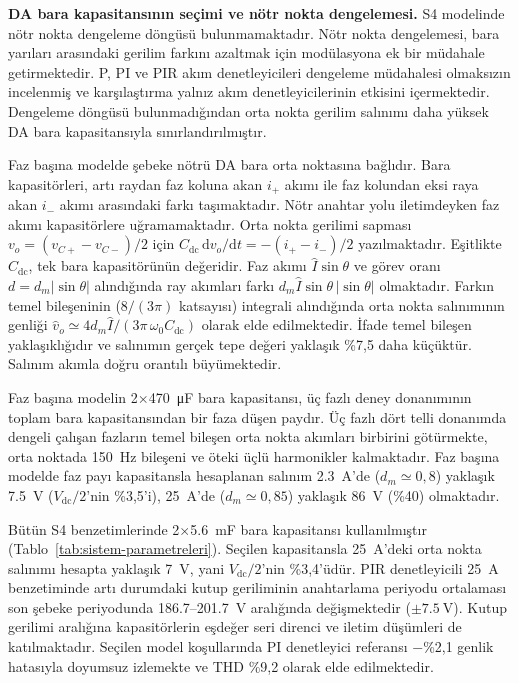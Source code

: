 \textbf{DA bara kapasitansının seçimi ve nötr nokta dengelemesi.} S4 modelinde nötr nokta dengeleme döngüsü bulunmamaktadır. Nötr nokta dengelemesi, bara yarıları arasındaki gerilim farkını azaltmak için modülasyona ek bir müdahale getirmektedir. P, PI ve PIR akım denetleyicileri dengeleme müdahalesi olmaksızın incelenmiş ve karşılaştırma yalnız akım denetleyicilerinin etkisini içermektedir. Dengeleme döngüsü bulunmadığından orta nokta gerilim salınımı daha yüksek DA bara kapasitansıyla sınırlandırılmıştır.

Faz başına modelde şebeke nötrü DA bara orta noktasına bağlıdır. Bara kapasitörleri, artı raydan faz koluna akan $i_{+}$ akımı ile faz kolundan eksi raya akan $i_{-}$ akımı arasındaki farkı taşımaktadır. Nötr anahtar yolu iletimdeyken faz akımı kapasitörlere uğramamaktadır. Orta nokta gerilimi sapması $v_o=(v_{C+}-v_{C-})/2$ için $C_{\mathrm{dc}}\,\mathrm{d}v_o/\mathrm{d}t=-(i_{+}-i_{-})/2$ yazılmaktadır. Eşitlikte $C_{\mathrm{dc}}$, tek bara kapasitörünün değeridir. Faz akımı $\hat I\sin\theta$ ve görev oranı $d=d_m|\sin\theta|$ alındığında ray akımları farkı $d_m\hat I\sin\theta\,|\sin\theta|$ olmaktadır. Farkın temel bileşeninin ($8/(3\pi)$ katsayısı) integrali alındığında orta nokta salınımının genliği $\hat v_o\simeq4d_m\hat I/(3\pi\,\omega_0C_{\mathrm{dc}})$ olarak elde edilmektedir. İfade temel bileşen yaklaşıklığıdır ve salınımın gerçek tepe değeri yaklaşık \%7,5 daha küçüktür. Salınım akımla doğru orantılı büyümektedir.

Faz başına modelin 2$\times$\SI{470}{\micro\farad} bara kapasitansı, üç fazlı deney donanımının toplam bara kapasitansından bir faza düşen paydır. Üç fazlı dört telli donanımda dengeli çalışan fazların temel bileşen orta nokta akımları birbirini götürmekte, orta noktada \SI{150}{\hertz} bileşeni ve öteki üçlü harmonikler kalmaktadır. Faz başına modelde faz payı kapasitansla hesaplanan salınım \SI{2.3}{\ampere}'de ($d_m\simeq0{,}8$) yaklaşık \SI{7.5}{\volt} ($V_{\mathrm{dc}}/2$'nin \%3,5'i), \SI{25}{\ampere}'de ($d_m\simeq0{,}85$) yaklaşık \SI{86}{\volt} (\%40) olmaktadır.

Bütün S4 benzetimlerinde 2$\times$\SI{5.6}{\milli\farad} bara kapasitansı kullanılmıştır (Tablo~\ref{tab:sistem-parametreleri}). Seçilen kapasitansla \SI{25}{\ampere}'deki orta nokta salınımı hesapta yaklaşık \SI{7}{\volt}, yani $V_{\mathrm{dc}}/2$'nin \%3,4'üdür. PIR denetleyicili \SI{25}{\ampere} benzetiminde artı durumdaki kutup geriliminin anahtarlama periyodu ortalaması son şebeke periyodunda \num{186.7}--\SI{201.7}{\volt} aralığında değişmektedir ($\pm\SI{7.5}{\volt}$). Kutup gerilimi aralığına kapasitörlerin eşdeğer seri direnci ve iletim düşümleri de katılmaktadır. Seçilen model koşullarında PI denetleyici referansı $-$\%2,1 genlik hatasıyla doyumsuz izlemekte ve THD \%9,2 olarak elde edilmektedir.

